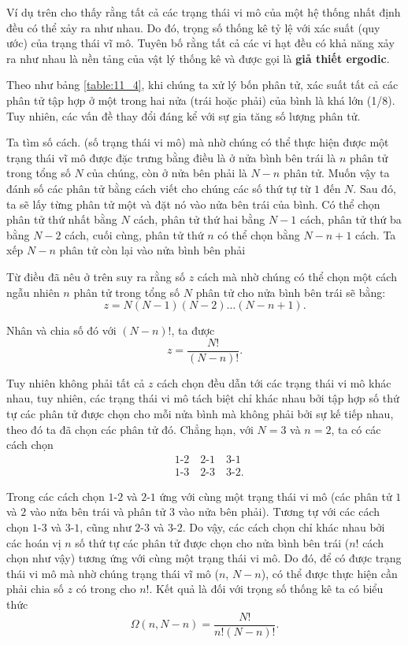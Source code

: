 Ví dụ trên cho thấy rằng tất cả các trạng thái vi mô của một hệ thống nhất định đều có thể xảy ra như nhau. Do đó, trọng số thống kê tỷ lệ với xác suất (quy ước) của trạng thái vĩ mô. Tuyên bố rằng tất cả các vi hạt đều có khả năng xảy ra như nhau là nền tảng của vật lý thống kê và được gọi là \textbf{giả thiết ergodic}.

Theo như bảng \ref{table:11_4}, khi chúng ta xử lý bốn phân tử, xác suất tất cả các phân tử tập hợp ở một trong hai nửa (trái hoặc phải) của bình là khá lớn (1/8). Tuy nhiên, các vấn đề thay đổi đáng kể với sự gia tăng số lượng phân tử.

Ta tìm số cách. (số trạng thái vi mô) mà nhờ chúng có thể thực hiện được một trạng thái vĩ mô được đặc trưng bằng điều là ở nửa bình bên trái là $n$ phân tử trong tổng số $N$ của chúng, còn ở nửa bên phải là $N-n$ phân tử. Muốn vậy ta đánh số các phân tử bằng cách viết cho chúng các số thứ tự từ $1$ đến $N$. Sau đó,  ta sẽ lấy từng phân tử một và đặt nó vào nửa bên trái của bình. Có thể chọn phân tử thứ nhất bằng $N$ cách, phân tử thứ hai bằng $N-1$ cách, phân tử thứ ba bằng $N-2$ cách, cuối cùng, phân tử thứ $n$ có thể chọn bằng $N-n+1$ cách. Ta xếp $N-n$ phân tử còn lại vào nửa bình bên phải

Từ điều đã nêu ở trên suy ra rằng số $z$ cách mà nhờ chúng có thể chọn một cách ngẫu nhiên $n$ phân tử trong tổng số $N$ phân tử cho nửa bình bên trái sẽ bằng:
\begin{equation*}
	z = N(N-1)(N-2)\ldots (N-n+1).
\end{equation*}

\noindent
Nhân và chia số đó với $(N-n)!$, ta được
\begin{equation}\label{eq:11_84}
	z = \frac{N!}{(N-n)!}.
\end{equation}

Tuy nhiên không phải tất cả $z$ cách chọn đều dẫn tới các trạng thái vi mô khác nhau, tuy nhiên, các trạng thái vi mô tách biệt chỉ khác nhau bởi tập hợp số thứ tự các phân tử được chọn cho mỗi nửa bình mà không phải bởi sự kế tiếp nhau, theo đó ta đã chọn các phân tử đó. Chẳng hạn, với $N=3$ và $n=2$, ta có các cách chọn
\begin{align*}
	&\!\! 1\text{-}2\quad 2\text{-}1\quad 3\text{-}1\\
	&\!\! 1\text{-}3\quad 2\text{-}3\quad 3\text{-}2.
\end{align*}

\noindent
Trong các cách chọn $1$-$2$ và $2$-$1$ ứng với cùng một trạng thái vi mô (các phân tử $1$ và $2$ vào nửa bên trái và phân tử $3$ vào nửa bên phải). Tương tự với các cách chọn $1$-$3$ và $3$-$1$, cũng như $2$-$3$ và $3$-$2$. Do vậy, các cách chọn chỉ khác nhau bởi các hoán vị $n$ số thứ tự các phân tử được chọn cho nửa bình bên trái ($n!$ cách chọn như vậy) tương ứng với cùng một trạng thái vi mô. Do đó, để có được trạng thái vi mô mà nhờ chúng trạng thái vĩ mô ($n$, $N-n$), có thể được thực hiện cần phải chia số $z$ có trong  cho $n!$. Kết quả là đối với trọng số thống kê ta có biểu thức
\begin{equation}\label{eq:11_85}
	\Omega(n, N-n) = \frac{N!}{n!(N-n)!}.
\end{equation}

